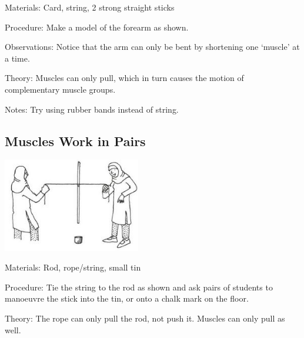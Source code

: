 \begin{multicols}{2}
\begin{description*}
\item[Materials:]{Card, string, 2 strong straight sticks}
\item[Procedure:]{Make a model of the forearm as
shown.}
\item[Observations:]{Notice that the arm
can only be bent by shortening
one `muscle' at a time.}
\item[Theory:]{Muscles can only pull, which in turn causes the motion of complementary muscle groups.}
\item[Notes:]{Try using rubber bands
instead of string.}
\end{description*}

\subsection{Muscles Work in Pairs}

\begin{center}
\includegraphics[width=0.45\textwidth]{./img/vso/muscle-pairs.jpg}
\end{center}

\begin{description*}
\item[Materials:]{Rod, rope/string, small tin}
\item[Procedure:]{Tie the string to the rod as shown
and ask pairs of students to
manoeuvre the stick into the tin,
or onto a chalk mark on the floor.
}
\item[Theory:]{The rope can only pull the rod,
not push it. Muscles can only pull
as well.}
\end{description*}


\end{multicols}
